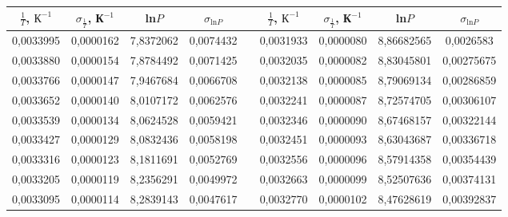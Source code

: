\documentclass[11pt]{article}
\begin{document}
\begin{table}[h]
\begin{tabular}{|c|c|c|c|c|c|c|c|c|}

\hline
$\frac{1}{T}$, $К^{-1}$ & $\sigma_{\frac{1}{T}}$, К$^{-1}$ & ln$P$     & $\sigma_{\text{ln}P}$ &  & $\frac{1}{T}$, $К^{-1}$ & $\sigma_{\frac{1}{T}}$, К$^{-1}$ & ln$P$      & $\sigma_{\text{ln}P}$ \\ \hline
0,0033995               & 0,0000162                        & 7,8372062 & 0,0074432             &  & 0,0031933               & 0,0000080                        & 8,86682565 & 0,0026583             \\ \hline
0,0033880               & 0,0000154                        & 7,8784492 & 0,0071425             &  & 0,0032035               & 0,0000082                        & 8,83045801 & 0,00275675            \\ \hline
0,0033766               & 0,0000147                        & 7,9467684 & 0,0066708             &  & 0,0032138               & 0,0000085                        & 8,79069134 & 0,00286859            \\ \hline
0,0033652               & 0,0000140                        & 8,0107172 & 0,0062576             &  & 0,0032241               & 0,0000087                        & 8,72574705 & 0,00306107            \\ \hline
0,0033539               & 0,0000134                        & 8,0624528 & 0,0059421             &  & 0,0032346               & 0,0000090                        & 8,67468157 & 0,00322144            \\ \hline
0,0033427               & 0,0000129                        & 8,0832436 & 0,0058198             &  & 0,0032451               & 0,0000093                        & 8,63043687 & 0,00336718            \\ \hline
0,0033316               & 0,0000123                        & 8,1811691 & 0,0052769             &  & 0,0032556               & 0,0000096                        & 8,57914358 & 0,00354439            \\ \hline
0,0033205               & 0,0000119                        & 8,2356291 & 0,0049972             &  & 0,0032663               & 0,0000099                        & 8,52507636 & 0,00374131            \\ \hline
0,0033095               & 0,0000114                        & 8,2839143 & 0,0047617             &  & 0,0032770               & 0,0000102                        & 8,47628619 & 0,00392837            \\ \hline

\end{tabular}
\end{table}
\end{document}

